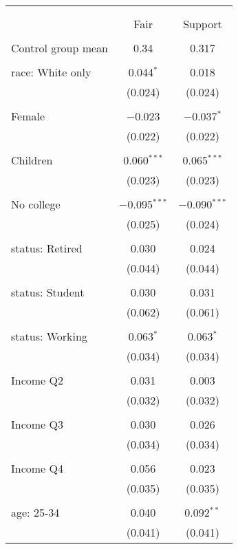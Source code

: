 
\begin{tabular}{@{\extracolsep{5pt}}lcc} 
\\[-1.8ex]\hline 
\hline \\[-1.8ex] 
\\[-1.8ex] & Fair & Support \\ 
\hline \\[-1.8ex] 
 Control group mean & 0.34 & 0.317  \\ \hline \\[-1.8ex] race: White only & 0.044$^{*}$ & 0.018 \\ 
  & (0.024) & (0.024) \\ 
  & & \\ 
 Female & $-$0.023 & $-$0.037$^{*}$ \\ 
  & (0.022) & (0.022) \\ 
  & & \\ 
 Children & 0.060$^{***}$ & 0.065$^{***}$ \\ 
  & (0.023) & (0.023) \\ 
  & & \\ 
 No college & $-$0.095$^{***}$ & $-$0.090$^{***}$ \\ 
  & (0.025) & (0.024) \\ 
  & & \\ 
 status: Retired & 0.030 & 0.024 \\ 
  & (0.044) & (0.044) \\ 
  & & \\ 
 status: Student & 0.030 & 0.031 \\ 
  & (0.062) & (0.061) \\ 
  & & \\ 
 status: Working & 0.063$^{*}$ & 0.063$^{*}$ \\ 
  & (0.034) & (0.034) \\ 
  & & \\ 
 Income Q2 & 0.031 & 0.003 \\ 
  & (0.032) & (0.032) \\ 
  & & \\ 
 Income Q3 & 0.030 & 0.026 \\ 
  & (0.034) & (0.034) \\ 
  & & \\ 
 Income Q4 & 0.056 & 0.023 \\ 
  & (0.035) & (0.035) \\ 
  & & \\ 
 age: 25-34 & 0.040 & 0.092$^{**}$ \\ 
  & (0.041) & (0.041) \\ 

\end{tabular}
